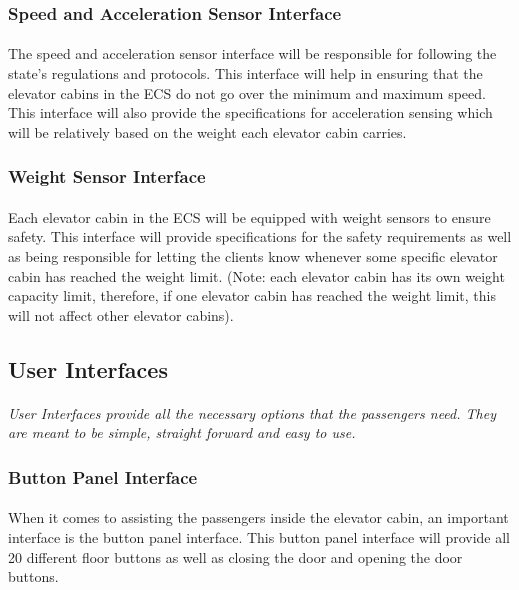\documentclass[12pt]{article}
\begin{document}
\subsubsection{Speed and Acceleration Sensor Interface}
\paragraph{} The speed and acceleration sensor interface will be responsible for following the state’s regulations and protocols. This interface will help in ensuring that the elevator cabins in the ECS do not go over the minimum and maximum speed.  This interface will also provide the specifications for acceleration sensing which will be relatively based on the weight each elevator cabin carries.

\subsubsection{Weight Sensor Interface}
\paragraph{} Each elevator cabin in the ECS will be equipped with weight sensors to ensure safety. This interface will provide specifications for the safety requirements as well as being responsible for letting the clients know whenever some specific elevator cabin has reached the weight limit. (Note: each elevator cabin has its own weight capacity limit, therefore, if one elevator cabin has reached the weight limit, this will not affect other elevator cabins).


\subsection{User Interfaces}
\paragraph{} \textit{User Interfaces provide all the necessary options that the passengers need.
They are meant to be simple, straight forward and easy to use.}
\subsubsection{Button Panel Interface}
\paragraph{} When it comes to assisting the passengers inside the elevator cabin, an important interface is the button panel interface. This button panel interface will provide all 20 different floor buttons as well as closing the door and opening the door buttons.
\end{document}
